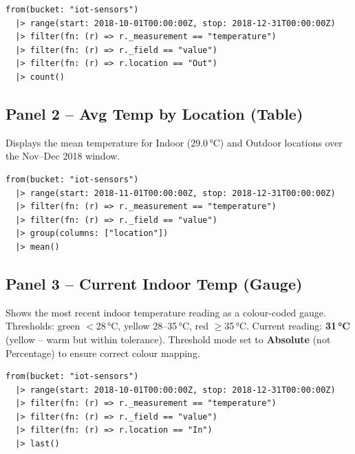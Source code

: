 \documentclass[11pt, letterpaper]{article}
\begin{document}
\begin{lstlisting}[caption={Panel 1 -- Outdoor count (second query)}]
from(bucket: "iot-sensors")
  |> range(start: 2018-10-01T00:00:00Z, stop: 2018-12-31T00:00:00Z)
  |> filter(fn: (r) => r._measurement == "temperature")
  |> filter(fn: (r) => r._field == "value")
  |> filter(fn: (r) => r.location == "Out")
  |> count()
\end{lstlisting}

\subsection{Panel 2 -- Avg Temp by Location (Table)}

Displays the mean temperature for Indoor (29.0\,°C) and Outdoor locations
over the Nov--Dec 2018 window.

\begin{lstlisting}[caption={Panel 2 -- Average temperature grouped by location}]
from(bucket: "iot-sensors")
  |> range(start: 2018-11-01T00:00:00Z, stop: 2018-12-31T00:00:00Z)
  |> filter(fn: (r) => r._measurement == "temperature")
  |> filter(fn: (r) => r._field == "value")
  |> group(columns: ["location"])
  |> mean()
\end{lstlisting}

\subsection{Panel 3 -- Current Indoor Temp (Gauge)}

Shows the most recent indoor temperature reading as a colour-coded gauge.
Thresholds: green $<$28\,°C, yellow 28--35\,°C, red $\geq$35\,°C.
Current reading: \textbf{31\,°C} (yellow -- warm but within tolerance).
Threshold mode set to \textbf{Absolute} (not Percentage) to ensure correct
colour mapping.

\begin{lstlisting}[caption={Panel 3 -- Last indoor temperature reading}]
from(bucket: "iot-sensors")
  |> range(start: 2018-10-01T00:00:00Z, stop: 2018-12-31T00:00:00Z)
  |> filter(fn: (r) => r._measurement == "temperature")
  |> filter(fn: (r) => r._field == "value")
  |> filter(fn: (r) => r.location == "In")
  |> last()
\end{lstlisting}

\end{document}
